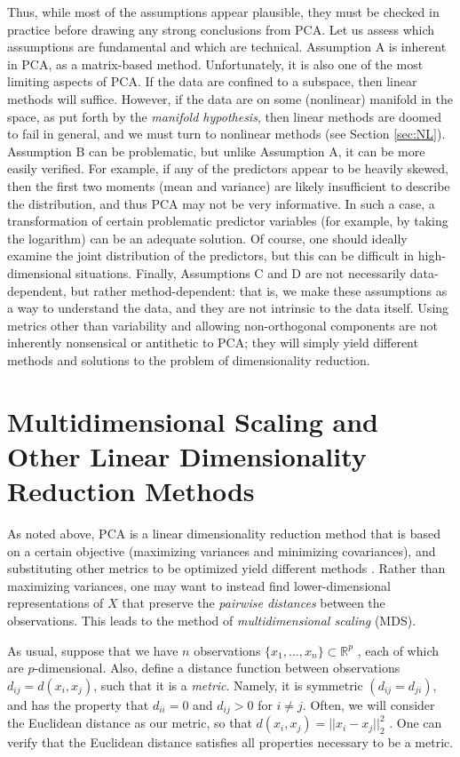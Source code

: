 \documentclass[12pt,letterpaper]{article}
\newcommand{\Rset}{\mathbb{R}}
\begin{document}
Thus, while most of the assumptions appear plausible, they must be checked in practice before drawing any strong conclusions from PCA. Let us assess which assumptions are fundamental and which are technical. 
%
Assumption A is inherent in PCA, as a matrix-based method. Unfortunately, it is also one of the most limiting aspects of PCA. If the data are confined to a subspace, then linear methods will suffice. However, if the data are on some (nonlinear) manifold in the space, as put forth by the \emph{manifold hypothesis}, then linear methods are doomed to fail in general, and we must turn to nonlinear methods (see Section \ref{sec:NL}). 
%
Assumption B can be problematic, but unlike Assumption A, it can be more easily verified. For example, if any of the predictors appear to be heavily skewed, then the first two moments (mean and variance) are likely insufficient to describe the distribution, and thus PCA may not be very informative. In such a case, a transformation of certain problematic predictor variables (for example, by taking the logarithm) can be an adequate solution. Of course, one should ideally examine the joint distribution of the predictors, but this can be difficult in high-dimensional
situations. 
%
Finally, Assumptions C and D are not necessarily data-dependent, but rather method-dependent: that is, we make these assumptions as a way to understand the data, and they are not intrinsic to the data itself. Using metrics other than variability and allowing non-orthogonal components are not inherently nonsensical or antithetic to PCA; they will simply yield different methods and solutions to the problem of dimensionality reduction.



\section{Multidimensional Scaling and Other Linear Dimensionality Reduction Methods}

As noted above, PCA is a linear dimensionality reduction method that is based on a certain objective (maximizing variances and minimizing covariances), and substituting other metrics to be optimized yield  different methods \cite{saul2006}.  Rather than maximizing variances, one may want to instead find lower-dimensional representations of $X$ that preserve the \emph{pairwise distances} between the observations. This leads to the method of \emph{multidimensional scaling} (MDS).

As usual, suppose that we have $n$ observations $\{ x_1, . . . , x_n\} \subset \Rset^p $ , each of which are $p$-dimensional. Also, define a distance function between observations $d_{ij} = d(x_i, x_j )$, such that it is a \emph{metric}. Namely, it is symmetric $(d_{ij} = d_{ji})$, and has the property that $d_{ii} = 0$ and $d_{ij} > 0$ for $i \neq j$. Often, we will consider the Euclidean distance as our metric, so that $d(x_i , x_j ) = ||x_i - x_j||_2^2$ . One can verify that the Euclidean distance satisfies all properties necessary to be a metric. 
\end{document}
